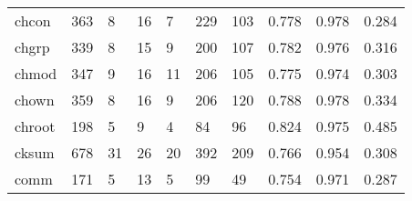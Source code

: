 \begin{longtable}{lp{1.3cm}p{1.3cm}p{1.3cm}p{1.3cm}p{1.3cm}p{1.3cm}p{1.3cm}p{1.3cm}p{1.3cm}}
chcon     &                    363 &                                  8 &                                16 &                                7 &                               229 &                             103 &                                   0.778 &                                  0.978 &                                0.284 \\
chgrp     &                    339 &                                  8 &                                15 &                                9 &                               200 &                             107 &                                   0.782 &                                  0.976 &                                0.316 \\
chmod     &                    347 &                                  9 &                                16 &                               11 &                               206 &                             105 &                                   0.775 &                                  0.974 &                                0.303 \\
chown     &                    359 &                                  8 &                                16 &                                9 &                               206 &                             120 &                                   0.788 &                                  0.978 &                                0.334 \\
chroot    &                    198 &                                  5 &                                 9 &                                4 &                                84 &                              96 &                                   0.824 &                                  0.975 &                                0.485 \\
cksum     &                    678 &                                 31 &                                26 &                               20 &                               392 &                             209 &                                   0.766 &                                  0.954 &                                0.308 \\
comm      &                    171 &                                  5 &                                13 &                                5 &                                99 &                              49 &                                   0.754 &                                  0.971 &                                0.287 \\

\end{longtable}
